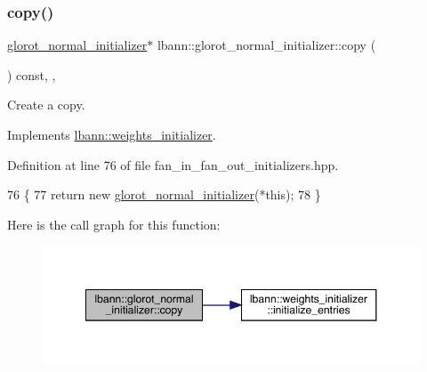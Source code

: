 \subsubsection{\texorpdfstring{copy()}{copy()}}
{\footnotesize\ttfamily \hyperlink{classlbann_1_1glorot__normal__initializer}{glorot\+\_\+normal\+\_\+initializer}$\ast$ lbann\+::glorot\+\_\+normal\+\_\+initializer\+::copy (\begin{DoxyParamCaption}{ }\end{DoxyParamCaption}) const\hspace{0.3cm}{\ttfamily [inline]}, {\ttfamily [override]}, {\ttfamily [virtual]}}

Create a copy. 

Implements \hyperlink{classlbann_1_1weights__initializer_acc84ce49188b74b23987cef3db18525a}{lbann\+::weights\+\_\+initializer}.



Definition at line 76 of file fan\+\_\+in\+\_\+fan\+\_\+out\+\_\+initializers.\+hpp.


\begin{DoxyCode}
76                                                    \{
77     \textcolor{keywordflow}{return} \textcolor{keyword}{new} \hyperlink{classlbann_1_1glorot__normal__initializer_ab2f600c58e8f5d978adf06802e6330d3}{glorot\_normal\_initializer}(*\textcolor{keyword}{this});
78   \}
\end{DoxyCode}
Here is the call graph for this function\+:\nopagebreak
\begin{figure}[H]
\begin{center}
\leavevmode
\includegraphics[width=348pt]{classlbann_1_1glorot__normal__initializer_a8d05bb2c3d56a5dc3ca4be2a62640470_cgraph}
\end{center}
\end{figure}
\mbox{\label{classlbann_1_1glorot__normal__initializer_a0bd7253159fe5ca9039af44b7fca1709}} 
